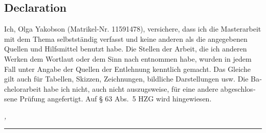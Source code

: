 %
\begin{otherlanguage}{ngerman}
	\chapter*{Declaration}
	\label{sec:declaration}
	\thispagestyle{empty}

	Ich, Olga Yakobson (Matrikel-Nr. 11591478), versichere, dass ich die Masterarbeit mit
	dem Thema \emph{\thesisTitle} selbstständig verfasst und keine
	anderen als die angegebenen Quellen und Hilfsmittel benutzt habe. Die Stellen der
	Arbeit, die ich anderen Werken dem Wortlaut oder dem Sinn nach entnommen habe,
	wurden in jedem Fall unter Angabe der Quellen der Entlehnung kenntlich gemacht.
	Das Gleiche gilt auch für Tabellen, Skizzen, Zeichnungen, bildliche Darstellungen
	usw. Die Bachelorarbeit habe ich nicht, auch nicht auszugsweise, für eine andere
	abgeschlossene Prüfung angefertigt. Auf § 63 Abs.\ 5 HZG wird hingewiesen.
	\bigskip

	\noindent\textit{\thesisUniversityCity, \thesisDate}

	\smallskip

	\begin{flushright}
		\begin{minipage}{5cm}
			\rule{\textwidth}{1pt}
			\centering\thesisName
		\end{minipage}
	\end{flushright}
\end{otherlanguage}
